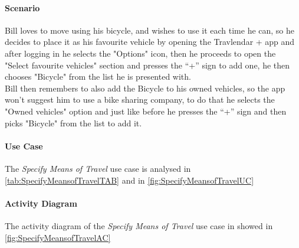 \paragraph*{Scenario\\}
Bill loves to move using his bicycle, and wishes to use it each time he can, so he decides to place it as his favourite vehicle by opening the Travlendar + app and after logging in he selects the "Options" icon, then he proceeds to open the "Select favourite vehicles" section and presses the “+” sign to add one, he then chooses "Bicycle" from the list he is presented with.\\
Bill then remembers to also add the Bicycle to his owned vehicles, so the app won't suggest him to use a bike sharing company, to do that he selects the "Owned vehicles" option and just like before he presses the “+” sign and then picks "Bicycle" from the list to add it.

\paragraph*{Use Case\\}
The \emph{Specify Means of Travel} use case is analysed in \autoref{tab:SpecifyMeansofTravelTAB} and in \autoref{fig:SpecifyMeansofTravelUC}
\paragraph*{Activity Diagram\\}
The activity diagram of the \emph{Specify Means of Travel} use case in showed in \autoref{fig:SpecifyMeansofTravelAC}
